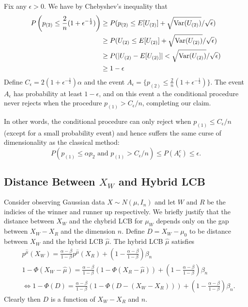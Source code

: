 \documentclass{article}
\newcommand{\Var}{\textup{Var}}
\begin{document}
\begin{appendix}
Fix any $\epsilon > 0$. We have by Chebyshev's inequality that  
\begin{align*}
    P\left(p_{(2)} \leq \frac{2}{n}(1 + \epsilon^{-\frac{1}{2}})\right) &\geq P(p_{(2)} \leq E[U_{(2)}] + \sqrt{\Var(U_{(2)})}/\sqrt{\epsilon})\\
    &\geq P(U_{(2)} \leq E[U_{(2)}] + \sqrt{\Var(U_{(2)})}/\sqrt{\epsilon})\\
    &\geq P(|U_{(2)} - E[U_{(2)}]| < \sqrt{\Var(U_{(2)})}/\sqrt{\epsilon} ) \\
    &\geq 1 - \epsilon
\end{align*}
Define $C_{\epsilon} = 2(1 + \epsilon^{-\frac{1}{2}})\alpha$ and the event $A_{\epsilon} = \{ p_{(2)} \leq \frac{2}{n}(1 + \epsilon^{-\frac{1}{2}})\}$. The event $A_{\epsilon}$ has probability at least $1-\epsilon$, and on this event a the conditional procedure never rejects when the procedure $p_{(1)} > C_{\epsilon}/n$, completing our claim. 

In other words, the conditional procedure can only reject when $p_{(1)} \leq C_{\epsilon}/n$ (except for a small probability event) and hence suffers the same curse of dimensionality as the classical method:
\begin{equation*}
    P(p_{(1)} \leq \alpha p_{2} \text{ and } p_{(1)} > C_{\epsilon}/n) \leq P(A_{\epsilon}^c) \leq \epsilon.  
\end{equation*}

\subsection{Distance Between $X_W$ and Hybrid LCB }
\label{sec:hybrid_gap_appdx}

Consider observing Gaussian data $X \sim N(\mu, I_n)$ and let $W$ and $R$ be the indicies of the winner and runner up respectively. We briefly justify that the distance between $X_W$ and the chybrid LCB for $\mu_W$ depends only on the gap between $X_W - X_R$ and the dimension $n$. Define $D = X_W - \mu_0$ to be distance between $X_W$ and the hybrid LCB $\hat{\mu}$. The hybrid LCB $\hat{\mu}$ satisfies 
\begin{align*}
    & p^{\hat{\mu}}(X_W) = \frac{\alpha-\beta}{1-\beta} p^{\hat{\mu}}(X_R) + \left(1 - \frac{\alpha-\beta}{1-\beta} \right)\beta_n\\
    & 1 - \Phi(X_W - \hat{\mu}) = \frac{\alpha-\beta}{1-\beta} (1 - \Phi(X_R - \hat{\mu})) + \left(1 - \frac{\alpha-\beta}{1-\beta} \right)\beta_n\\ 
    &\iff 1 - \Phi(D) = \frac{\alpha-\beta}{1-\beta} (1 - \Phi(D - (X_W - X_R))) + \left(1 - \frac{\alpha-\beta}{1-\beta} \right)\beta_n.
\end{align*}
Clearly then $D$ is a function of $X_W - X_R$ and $n$.


\end{appendix}
\end{document}
